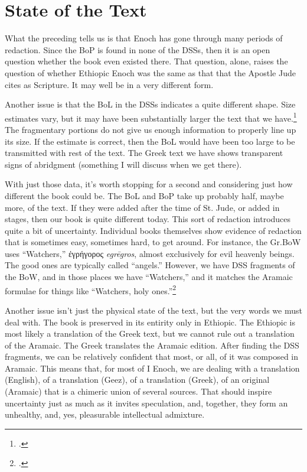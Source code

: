 \documentclass{article}
\begin{document}
\section{State of the Text}

What the preceding tells us is that Enoch has gone through many periods of redaction.
Since the BoP is found in none of the DSSs, then it is an open question whether the book even existed there.
That question, alone, raises the question of whether Ethiopic Enoch was the same as that that the Apostle Jude cites as Scripture.
It may well be in a very different form.

Another issue is that the BoL in the DSSs indicates a quite different shape.
Size estimates vary, but it may have been substantially larger the text that we have.\footcite[357]{GNickelsburg2}
The fragmentary portions do not give us enough information to properly line up its size.
If the estimate is correct, then the BoL would have been too large to be transmitted with rest of the text.
The Greek text we have shows transparent signs of abridgment (something I will discuss when we get there).

With just those data, it's worth stopping for a second and considering just how different the book could be.
The BoL and BoP take up probably half, maybe more, of the text.
If they were added after the time of St. Jude, or added in stages, then our book is quite different today.
This sort of redaction introduces quite a bit of uncertainty.
Individual books themselves show evidence of redaction that is sometimes easy, sometimes hard, to get around.
For instance, the Gr.BoW uses ``Watchers,'' \textgreek{ἐγρήγορος} \emph{egrēgros}, almost exclusively for evil heavenly beings.
The good ones are typically called ``angels.''
However, we have DSS fragments of the BoW, and in those places we have ``Watchers,'' and it matches the Aramaic formulae for things like ``Watchers, holy ones.''\footcite[141]{GNickelsburg1}

Another issue isn't just the physical state of the text, but the very words we must deal with.
The book is preserved in its entirity only in Ethiopic.
The Ethiopic is most likely a translation of the Greek text, but we cannot rule out a translation of the Aramaic.
The Greek translates the Aramaic edition.
After finding the DSS fragments, we can be relatively confident that most, or all, of it was composed in Aramaic.
This means that, for most of I Enoch, we are dealing with a translation (English), of a translation (Geez), of a translation (Greek), of an original (Aramaic) that is a chimeric union of several sources.
That should inspire uncertainty just as much as it invites speculation, and, together, they form an unhealthy, and, yes, pleasurable intellectual admixture.
\end{document}
